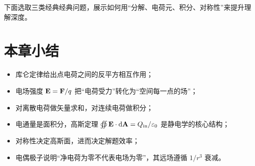 下面选取三类经典经典问题，展示如何用“分解、电荷元、积分、对称性”来提升理解深度。

\section*{本章小结}

\begin{itemize}
  \item 库仑定律给出点电荷之间的反平方相互作用；
  \item 电场强度 $\vb{E}=\vb{F}/q$ 把“电荷受力”转化为“空间每一点的场”；
  \item 对离散电荷做矢量求和，对连续电荷做积分；
  \item 电通量是面积分，\;高斯定理 $\oiint \vb{E}\cdot\dd\vb{A}=Q_{\text{in}}/\varepsilon_0$ 是静电学的核心结构；
  \item 对称性决定高斯面，进而决定解题效率；
  \item 电偶极子说明“净电荷为零不代表电场为零”，其远场遵循 $1/r^3$ 衰减。
\end{itemize}

